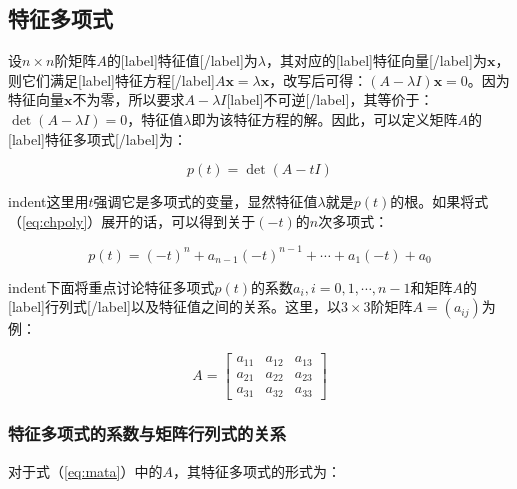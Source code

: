 \documentclass[UTF8,nofonts]{ctexart}
\begin{document}

\subsection*{特征多项式}

设$n \times n$阶矩阵$A$的[label]特征值[/label]为$\lambda$，其对应的[label]特征向量[/label]为$\boldsymbol{x}$，则它们满足[label]特征方程[/label]$A\boldsymbol{x}=\lambda\boldsymbol{x}$，改写后可得：$(A-\lambda I)\boldsymbol{x}=0$。因为特征向量$\boldsymbol{x}$不为零，所以要求$A-\lambda I$[label]不可逆[/label]，其等价于：$\det(A-\lambda I)=0$，特征值$\lambda$即为该特征方程的解。因此，可以定义矩阵$A$的[label]特征多项式[/label]为：

\begin{equation}
\label{eq:chpoly}
p(t)=\det(A-tI)
\end{equation}

indent这里用$t$强调它是多项式的变量，显然特征值$\lambda$就是$p(t)$的根。如果将式（\ref{eq:chpoly}）展开的话，可以得到关于$(-t)$的$n$次多项式：

\[
p(t)=(-t)^n+a_{n-1}(-t)^{n-1}+\cdots+a_1(-t)+a_0
\]

indent下面将重点讨论特征多项式$p(t)$的系数$a_i,i=0,1,\cdots,n-1$和矩阵$A$的[label]行列式[/label]以及特征值之间的关系。这里，以$3 \times 3$阶矩阵$A=(a_{ij})$为例：

\begin{equation}
\label{eq:mata}
A=\begin{bmatrix}
a_{11}&a_{12}&a_{13}\\a_{21}&a_{22}&a_{23}\\a_{31}&a_{32}&a_{33}
\end{bmatrix}
\end{equation}

\subsubsection*{特征多项式的系数与矩阵行列式的关系}

对于式（\ref{eq:mata}）中的$A$，其特征多项式的形式为：
\end{document}
